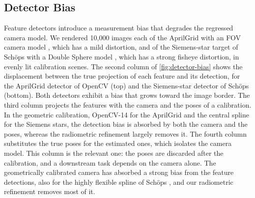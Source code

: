 \subsection{Detector Bias}
\label{sec:detector-bias}
Feature detectors introduce a measurement bias that degrades the
regressed camera model. We rendered 10,000 images each of the
AprilGrid \cite{furgale2013unified,olson2011apriltag} with an FOV
camera model \cite{devernay2001straight}, which has a mild
distortion, and of the Siemens-star target of Schöps \etal
\cite{10000params} with a Double Sphere model \cite{double-sphere},
which has a strong fisheye distortion, in evenly lit calibration
scenes. The second column of \cref{fig:detector-bias} shows
the displacement between the true projection of each feature and its
detection, for the AprilGrid detector of OpenCV \cite{opencv_library}
(top) and the Siemens-star detector of Schöps \etal (bottom). Both
detectors exhibit a bias that grows toward the image border. The third
column projects the features with the camera and the poses of a
calibration. In the geometric calibration, OpenCV-14 for the AprilGrid
and the central spline for the Siemens stars, the detection bias is
absorbed by both the camera and the poses, whereas the radiometric
refinement largely removes it. The fourth column substitutes the true
poses for the estimated ones, which isolates the camera model. This
column is the relevant one: the poses are discarded after the
calibration, and a downstream task depends on the camera alone.
The geometrically calibrated camera has absorbed a strong bias from
the feature detections, also for the highly flexible spline of Schöps
\etal, and our radiometric refinement removes most of it.




